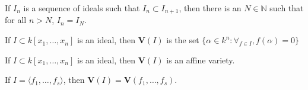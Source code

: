                 \begin{theorem}
                    If $I_n$ is a sequence of ideals such that
                    $I_{n}\subset I_{n+1}$, then there is an
                    $N\in\mathbb{N}$ such that for all $n>N$,
                    $I_n=I_N$.
                \end{theorem}
                \begin{definition}
                    If $I\subset k[x_1,\hdots ,x_n]$ is an ideal,
                    then $\textbf{V}(I)$ is the set
                    $\{\alpha\in k^n:\forall_{f\in I},f(\alpha)=0\}$
                \end{definition}
                \begin{theorem}
                    If $I\subset k[x_1,\hdots ,x_n]$ is an ideal,
                    then $\textbf{V}(I)$ is an affine variety.
                \end{theorem}
                \begin{theorem}
                    If $I=\langle f_1,\hdots, f_s\rangle$,
                    then $\textbf{V}(I)=\mathbf{V}(f_1,\hdots,f_s)$.
                \end{theorem}
